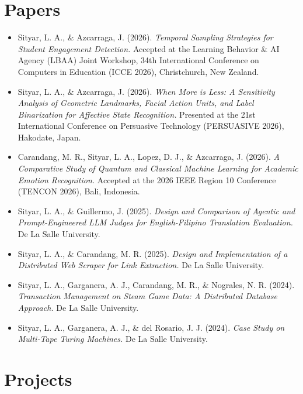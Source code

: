 \documentclass[10.5pt, letterpaper]{article}
\begin{document}
\section{Papers}

\begin{itemize}[leftmargin=1.1em]
    \item Sityar, L. A., \& Azcarraga, J. (2026). \textit{Temporal Sampling Strategies for Student Engagement Detection.} Accepted at the Learning Behavior \& AI Agency (LBAA) Joint Workshop, 34th International Conference on Computers in Education (ICCE 2026), Christchurch, New Zealand.
    \item Sityar, L. A., \& Azcarraga, J. (2026). \textit{When More is Less: A Sensitivity Analysis of Geometric Landmarks, Facial Action Units, and Label Binarization for Affective State Recognition.} Presented at the 21st International Conference on Persuasive Technology (PERSUASIVE 2026), Hakodate, Japan.
    \item Carandang, M. R., Sityar, L. A., Lopez, D. J., \& Azcarraga, J. (2026). \textit{A Comparative Study of Quantum and Classical Machine Learning for Academic Emotion Recognition.} Accepted at the 2026 IEEE Region 10 Conference (TENCON 2026), Bali, Indonesia.
    \item Sityar, L. A., \& Guillermo, J. (2025). \textit{Design and Comparison of Agentic and Prompt-Engineered LLM Judges for English-Filipino Translation Evaluation.} De La Salle University.
    \item Sityar, L. A., \& Carandang, M. R. (2025). \textit{Design and Implementation of a Distributed Web Scraper for Link Extraction.} De La Salle University.
    \item Sityar, L. A., Garganera, A. J., Carandang, M. R., \& Nograles, N. R. (2024). \textit{Transaction Management on Steam Game Data: A Distributed Database Approach.} De La Salle University.
    \item Sityar, L. A., Garganera, A. J., \& del Rosario, J. J. (2024). \textit{Case Study on Multi-Tape Turing Machines.} De La Salle University.
\end{itemize}

\section{Projects}
\end{document}
